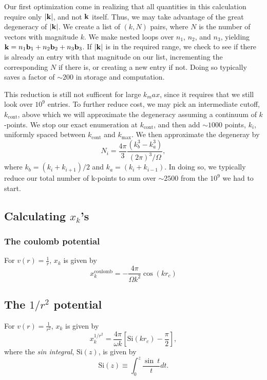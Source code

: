 \documentclass{article}
\begin{document}
Our first optimization come in realizing that all quantities in this
calculation require only $|\mathbf{k}|$, and not $\mathbf{k}$ itself.  Thus, we may
take advantage of the great degeneracy of $|\mathbf{k}|$.  We create a list
of $(k,N)$ pairs, where $N$ is the number of vectors with magnitude $k$.
We make nested loops over
$n_1$, $n_2$, and $n_3$, yielding $\mathbf{k} = n_1 \mathbf{b}_1 + n_2 \mathbf{b}_2 + n_3
\mathbf{b}_3$. If $|\mathbf{k}|$ is in the required range, we check to see if there
is already an entry with that magnitude on our list, incrementing the
corresponding $N$ if there is, or creating a new entry if not.  Doing
so typically saves a factor of $\sim 200$ in storage and computation.

This reduction is still not sufficent for large $k_max$, since it
requires that we still look over $10^9$ entries.  To further reduce
cost, we may pick an intermediate cutoff, $k_\text{cont}$, above which
we will approximate the degeneracy assuming a continuum of
$k$-points.  We stop our exact enumeration at $k_\text{cont}$, and
then add $\sim 1000$ points, $k_i$, uniformly spaced between $k_\text{cont}$
and $k_\text{max}$. We then approximate the degeneray by
\begin{equation}
N_i = \frac{4 \pi}{3} \frac{\left( k_b^3 -k_a^3\right)}{(2\pi)^3/\Omega},
\end{equation}
where $k_b = (k_i + k_{i+1})/2$ and $k_a = (k_i + k_{i-1})$.  In doing
so, we typically reduce our total number of k-points to sum over $\sim
2500$ from the $10^9$ we had to start.

\subsection{Calculating $x_k$'s}
\subsubsection{The coulomb potential}
For $v(r) = \frac{1}{r}$, $x_k$ is given by
\begin{equation}
x_k^{\text{coulomb}} = -\frac{4 \pi}{\Omega k^2} \cos(k r_c)
\end{equation}

\subsection{The $1/r^2$ potential}
For $v(r) = \frac{1}{r^2}$, $x_k$ is given by
\begin{equation}
x_k^{1/r^2} = \frac{4 \pi}{\omega k} 
\left[ \text{Si}(k r_c) -\frac{\pi}{2}\right],
\end{equation}
where the {\em sin integral}, $\text{Si}(z)$, is given by
\begin{equation}
\text{Si}(z) \equiv \int_0^z \frac{\sin \ t}{t} dt.
\end{equation}
\end{document}
